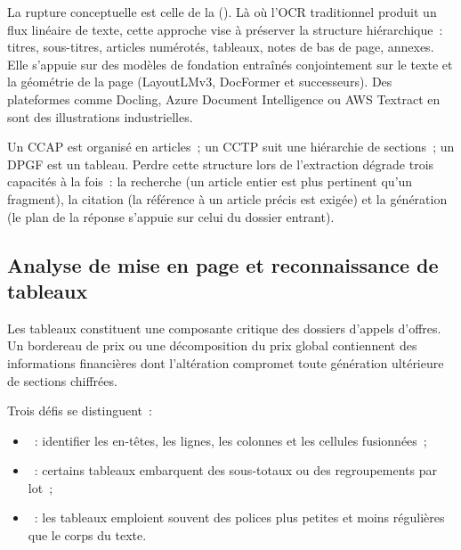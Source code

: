 La rupture conceptuelle est celle de la  (). Là où l'OCR traditionnel
produit un flux linéaire de texte, cette approche vise à préserver la
structure hiérarchique~: titres, sous-titres, articles numérotés, tableaux,
notes de bas de page, annexes. Elle s'appuie sur des modèles de fondation
entraînés conjointement sur le texte et la géométrie de la page
(LayoutLMv3, DocFormer et successeurs). Des plateformes comme Docling,
Azure Document Intelligence ou AWS Textract en sont des illustrations
industrielles.

\begin{btpbox}
Un CCAP est organisé en articles~; un CCTP suit une hiérarchie de sections~;
un DPGF est un tableau. Perdre cette structure lors de l'extraction
dégrade trois capacités à la fois~: la recherche (un article entier est
plus pertinent qu'un fragment), la citation (la référence à un article
précis est exigée) et la génération (le plan de la réponse s'appuie sur
celui du dossier entrant).
\end{btpbox}

\subsection{Analyse de mise en page et reconnaissance de tableaux}

Les tableaux constituent une composante critique des dossiers d'appels
d'offres. Un bordereau de prix ou une décomposition du prix global
contiennent des informations financières dont l'altération compromet
toute génération ultérieure de sections chiffrées.

Trois défis se distinguent~:

\begin{itemize}
  \item {}~: identifier les en-têtes, les
        lignes, les colonnes et les cellules fusionnées~;
  \item {}~: certains tableaux
        embarquent des sous-totaux ou des regroupements par lot~;
  \item {}~: les tableaux emploient souvent des
        polices plus petites et moins régulières que le corps du texte.
\end{itemize}

